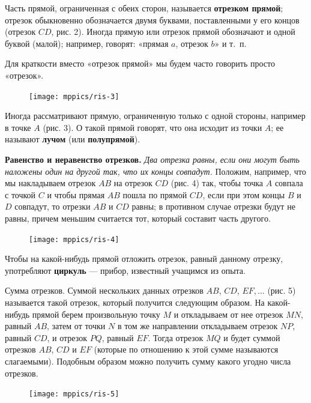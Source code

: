 \documentclass[oneside]{book}
\begin{document}
Часть прямой, ограниченная с обеих сторон, называется \textbf{отрезком прямой};
отрезок обыкновенно обозначается двумя буквами, поставленными у его концов (отрезок $CD$, рис. 2).
Иногда прямую или отрезок прямой 
обозначают и одной буквой
(малой);
например, говорят:
«прямая $a$, отрезок $b$» и т.~п.

Для краткости вместо «отрезок прямой» мы будем часто говорить просто «отрезок».

\begin{figure}
\texttt{[image: mppics/ris-3]}
\caption{}
\end{figure}

Иногда рассматривают прямую, ограниченную только с одной стороны, например в точке $A$ (рис. 3).
О такой прямой говорят, что она исходит из точки $A$;
ее называют \textbf{лучом} (или \textbf{полупрямой}). %

\textbf{Равенство и неравенство отрезков.}
\emph{Два отрезка равны, если они могут быть наложены один на другой так, что их концы совпадут.}
Положим, например, что мы накладываем отрезок $AB$ на
отрезок $CD$ (рис. 4) так, чтобы точка $A$ совпала с точкой $C$ и чтобы прямая $AB$ пошла по прямой $CD$, если при этом концы $B$ и $D$ совпадут, то отрезки $AB$ и $CD$ равны;
в противном случае отрезки будут не равны, причем меньшим считается тот, который составит часть другого.


\begin{figure}[h!]
\begin{center}
\texttt{[image: mppics/ris-4]}
\caption{}
\end{center}
\end{figure}


Чтобы на какой-нибудь прямой отложить отрезок, равный данному отрезку, употребляют \textbf{циркуль} — прибор, известный учащимся из опыта.

Сумма отрезков.
Суммой нескольких данных отрезков $AB$, $CD$, $EF,\dots$
(рис. 5) называется такой отрезок, который получится следующим образом.
На какой-нибудь прямой берем произвольную точку $M$ и откладываем от нее отрезок $MN$, равный $AB$, затем от точки $N$ в том же направлении откладываем отрезок $NP$, равный $CD$, и отрезок $PQ$, равный $EF$.
Тогда отрезок $MQ$ и будет суммой отрезков $AB$, $CD$ и $EF$ (которые по отношению к этой сумме называются слагаемыми).
Подобным образом можно получить сумму какого угодно числа отрезков.

\begin{figure}[h!]
\begin{center}
\texttt{[image: mppics/ris-5]}
\caption{}
\end{center}
\end{figure}
\end{document}
